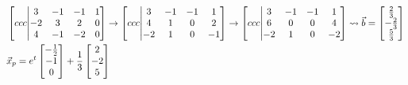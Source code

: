 \documentclass[11pt, fleqn]{article}
\begin{document}
\begin{align*}
    &\augmatrix{ccc}{3&-1&-1&1\\-2&3&2&0\\4&-1&-2&0}\to\augmatrix{ccc}{3&-1&-1&1\\4&1&0&2\\-2&1&0&-1}\to\augmatrix{ccc}{3&-1&-1&1\\6&0&0&4\\-2&1&0&-2}\leadsto\vec{b}=\matrixx{\frac{2}{3}\\-\frac{2}{3}\\\frac{5}{3}}\\
    &\vec{x}_p=e^t\matrixx{-\frac{1}{2}\\-1\\0}+\frac{1}{3}\matrixx{2\\-2\\5}
\end{align*}
\end{document}
